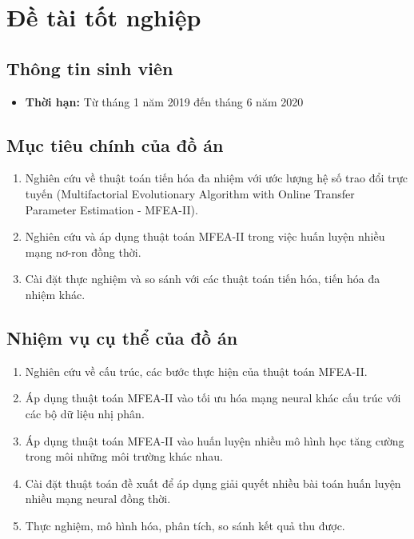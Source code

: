 \chapter*{Đề tài tốt nghiệp}
\section*{Thông tin sinh viên}

\begin{itemize}
\item \textbf{Thời hạn:} Từ tháng 1 năm 2019 đến tháng 6 năm 2020
\end{itemize}
\section*{Mục tiêu chính của đồ án}
\begin{enumerate}
    \item Nghiên cứu về thuật toán tiến hóa đa nhiệm với ước lượng hệ số trao đổi trực tuyến (Multifactorial Evolutionary Algorithm with Online Transfer Parameter Estimation - MFEA-II).
    \item Nghiên cứu và áp dụng thuật toán MFEA-II trong việc huấn luyện nhiều mạng nơ-ron đồng thời.
    \item Cài đặt thực nghiệm và so sánh với các thuật toán tiến hóa, tiến hóa đa nhiệm khác.
\end{enumerate}

\section*{Nhiệm vụ cụ thể của đồ án}
\begin{enumerate}
    \item Nghiên cứu về cấu trúc, các bước thực hiện của thuật toán MFEA-II.
    \item Áp dụng thuật toán MFEA-II vào tối ưu hóa mạng neural khác cấu trúc với các bộ dữ liệu nhị phân.
    \item Áp dụng thuật toán MFEA-II vào huấn luyện nhiều mô hình học tăng cường trong môi những môi trường khác nhau.
    \item Cài đặt thuật toán đề xuất để áp dụng giải quyết nhiều bài toán huấn luyện nhiều mạng neural đồng thời.
    \item Thực nghiệm, mô hình hóa, phân tích, so sánh kết quả thu được.
\end{enumerate}


